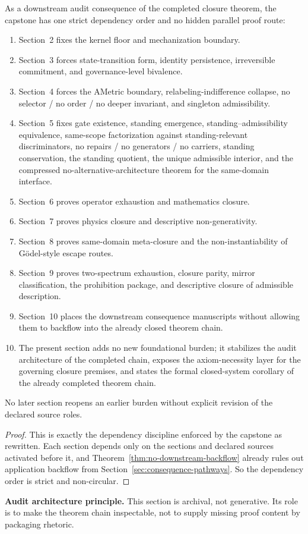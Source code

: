 \begin{theorem}
\label{thm:final-dependency-register}
As a downstream audit consequence of the completed closure theorem, the capstone has one strict dependency order and no hidden parallel proof route:
\begin{enumerate}
  \item Section~2 fixes the kernel floor and mechanization boundary.
  \item Section~3 forces state-transition form, identity persistence, irreversible commitment, and governance-level bivalence.
  \item Section~4 forces the AMetric boundary, relabeling-indifference collapse, no selector / no order / no deeper invariant, and singleton admissibility.
  \item Section~5 fixes gate existence, standing emergence, standing--admissibility equivalence, same-scope factorization against standing-relevant discriminators, no repairs / no generators / no carriers, standing conservation, the standing quotient, the unique admissible interior, and the compressed no-alternative-architecture theorem for the same-domain interface.
  \item Section~6 proves operator exhaustion and mathematics closure.
  \item Section~7 proves physics closure and descriptive non-generativity.
  \item Section~8 proves same-domain meta-closure and the non-instantiability of G\"odel-style escape routes.
  \item Section~9 proves two-spectrum exhaustion, closure parity, mirror classification, the prohibition package, and descriptive closure of admissible description.
  \item Section~10 places the downstream consequence manuscripts without allowing them to backflow into the already closed theorem chain.
  \item The present section adds no new foundational burden; it stabilizes the audit architecture of the completed chain, exposes the axiom-necessity layer for the governing closure premises, and states the formal closed-system corollary of the already completed theorem chain.
\end{enumerate}
No later section reopens an earlier burden without explicit revision of the declared source roles.
\end{theorem}

\begin{proof}
This is exactly the dependency discipline enforced by the capstone as rewritten. Each section depends only on the sections and declared sources activated before it, and Theorem~\ref{thm:no-downstream-backflow} already rules out application backflow from Section~\ref{sec:consequence-pathways}. So the dependency order is strict and non-circular.
\end{proof}

\begin{reviewbox}
\textbf{Audit architecture principle.} This section is archival, not generative. Its role is to make the theorem chain inspectable, not to supply missing proof content by packaging rhetoric.
\end{reviewbox}
